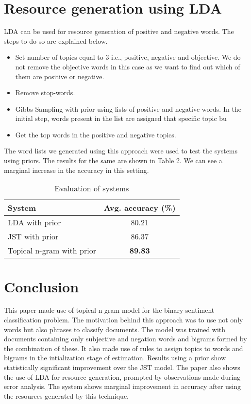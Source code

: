 \documentclass[11pt]{article}
\begin{document}
\section{Resource generation using LDA}\label{resource}

LDA can be used for resource generation of positive and negative words. The steps to do so are explained below.

\begin{itemize}
 \itemsep0em
 \item Set number of topics equal to 3 i.e., positive, negative and objective. We do not remove the objective
 words in this case as we want to find out which of them are positive or negative.
 \item Remove stop-words.
 \item Gibbs Sampling with prior using lists of positive and negative words. In the initial step, words present 
 in the list are assigned that specific topic bu
 \item Get the top words in the positive and negative topics.
\end{itemize}

The word lists we generated using this approach were used to test the systems using priors. The results for the same
are shown in Table 2. We can see a marginal increase in the accuracy in this setting.

\begin{table}[h]
\begin{center}
\begin{tabular}{|l|c|}
\hline \bf System & \bf Avg. accuracy (\%)\\ \hline
LDA with prior & 80.21\\
JST with prior & 86.37\\
Topical n-gram with prior & \textbf{89.83}\\
\hline
\end{tabular}
\end{center}
\caption{\label{result-table} Evaluation of systems}
\end{table}

\section{Conclusion}\label{conclusion}

This paper made use of topical n-gram model for the binary sentiment classification problem. The motivation behind this
approach was to use not only words but also phrases to classify documents. The model was trained with documents containing
only subjective and negation words and bigrams formed by the combination of these. It also made use of rules to 
assign topics to words and bigrams in the intialization stage of estimation. Results using a prior show statistically 
significant improvement over the JST model. The paper also shows the use of LDA for resource generation, prompted by 
observations made during error analysis. The system shows marginal improvement in accuracy after using the resources
generated by this technique.
\end{document}
